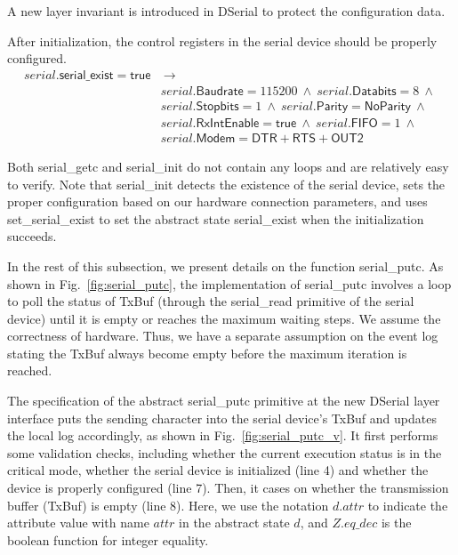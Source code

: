 A new layer invariant is introduced in DSerial to protect the configuration data.

\begin{invariant}
	After initialization, the control registers in the serial device should
be properly configured.
\[
\begin{array}{ll}
	serial.\textsf{serial\_exist} = \textsf{true}  & ~\rightarrow \\
	& serial.\textsf{Baudrate} = 115200 ~\wedge~
	  serial.\textsf{Databits} = 8 ~\wedge~ \\
	& serial.\textsf{Stopbits} = 1 ~\wedge~ 
	  serial.\textsf{Parity} = \textsf{NoParity} ~\wedge~ \\
	& serial.\textsf{RxIntEnable} = \textsf{true} ~\wedge~ 
	  serial.\textsf{FIFO} = 1 ~\wedge~ \\
	&  serial.\textsf{Modem} = \textsf{DTR} + \textsf{RTS} + \textsf{OUT2}
\end{array}
\]

\end{invariant}

Both \textsf{serial\_getc} and \textsf{serial\_init} do not contain any loops
and are relatively easy to verify. Note that \textsf{serial\_init} detects the
existence of the serial device, sets the proper configuration based on our hardware
connection parameters, and uses \textsf{set\_serial\_exist} to set the abstract
state \textsf{serial\_exist} when the initialization succeeds.

In the rest of this subsection, we present details on the function
\textsf{serial\_putc}. As shown in Fig.~\ref{fig:serial_putc}, the
implementation of \textsf{serial\_putc} involves a loop to poll the status of
TxBuf (through the \textsf{serial\_read} primitive of the serial device) until it is
empty or reaches the maximum waiting steps. We assume the correctness of
hardware. Thus, we have a separate assumption on the event log stating the TxBuf
always become empty before the maximum iteration is reached.

The specification of the abstract \textsf{serial\_putc} primitive at the new
DSerial layer interface puts the sending character into the serial device's
TxBuf and updates the local log accordingly, as shown in
Fig.~\ref{fig:serial_putc_v}. It first performs some validation checks, including
whether the current execution status is in the critical mode, whether the serial
device is initialized (line 4) and whether the device is properly configured
(line 7). Then, it cases on whether the transmission buffer (TxBuf) is empty
(line 8). Here, we use the notation $d.attr$ to indicate the attribute
value with name $attr$ in the abstract state $d$, and $Z.eq\_dec$ is the
boolean function for integer equality.

